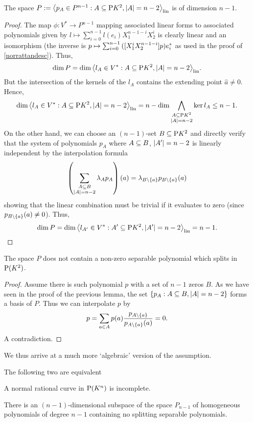 \begin{lemma}
    The space $P:=\gen{p_A\in P^{n-1}:A\setleq \proj{K^2},\card A=n-2}_{\lin}$ is of dimension $n-1$.
\end{lemma}

\begin{proof}
    The map $\phi:V^{\ast}\to P^{n-1}$ mapping associated linear forms to associated polynomials given by $l\mapsto \sum_{i=0}^{n-1}{l(e_i)X_1^{n-1-i}X_2^i}$ is clearly linear and an isomorphism (the inverse is $p\mapsto\sum_{i=0}^{n-1}{([X_1^i X_2^{n-1-i}]p)e^{\ast}_i}$ as used in the proof of \autoref{norrattandesc}). Thus,
    $$
\dim{P}=\dim\gen[\lin]{l_A\in V^{\ast}:A\setleq \proj{K^2},\card A=n-2}.
$$
But the intersection of the kernels of the $l_A$ contains the extending point $\hat{a}\neq 0$. Hence, 
$$
\dim\gen[\lin]{l_A\in V^{\ast}:A\setleq \proj{K^2},\card A=n-2}=n-\dim\bigmeet_{\substack{A\setleq\proj{K^2}\\ \card A=n-2}}{\ker{l_A}}\leq n-1.
$$
On the other hand, we can choose an $(n-1)$-set $B\subseteq \mathrm{P}{K^2}$ and directly verify that the system of polynomials $p_A$ where $A\subseteq B$, $\left|A'\right|=n-2$ is linearly independent by the interpolation formula
$$
\left(\sum_{\substack{A\subseteq B\\ \left|A\right|=n-2}}{\lambda_A p_A}\right)(a)=\lambda_{B\setminus\left\{a\right\}}p_{B\setminus\left\{a\right\}}(a)
$$
showing that the linear combination must be trivial if it evaluates to zero (since $p_{B\setminus\left\{a\right\}}(a)\neq 0$).
Thus,
$$
\dim{P}=\dim\gen[\lin]{l_{A'}\in V^{\ast}:A'\setleq \proj{K^2},\card{A'}=n-2}=n-1.
$$
\end{proof}

\begin{lemma}
    The space $P$ does not contain a non-zero separable polynomial which splits in $\mathrm{P}(K^2)$.
\end{lemma}

\begin{proof}
    Assume there is such polynomial $p$ with a set of $n-1$ zeros $B$.
    As we have seen in the proof of the previous lemma, the set $\left\{p_A:A\subseteq B,\left|A\right|=n-2\right\}$ forms a basis of $P$. Thus we can interpolate $p$ by
    $$
    p=\sum_{a\in A}{p(a)\frac{p_{A\setminus\left\{a\right\}}}{p_{A\setminus\left\{a\right\}}(a)}}=0.
    $$
    A contradiction.
\end{proof}

We thus arrive at a much more `algebraic' version of the assumption. 

\begin{lemma}\label{char-incomp-nor-rat-curve}
    The following two are equivalent
    \begin{statements}
            \item A normal rational curve in $\mathrm{P} (K^n)$ is incomplete.\label{norrat-incomp}
            \item There is an $(n-1)$-dimensional subspace of the space $P_{n-1}$ of homogeneous polynomials of degree $n-1$ containing no splitting separable polynomials.\label{subspace-without-sep-spl-poly}
    \end{statements}
\end{lemma}

